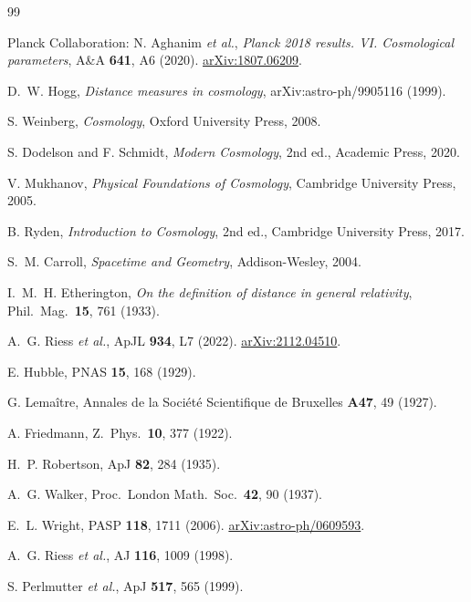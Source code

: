 \documentclass[11pt,a4paper,openany]{report}
\begin{document}
\begin{thebibliography}{99}

Planck Collaboration: N. Aghanim \emph{et al.},
\textit{Planck 2018 results. VI. Cosmological parameters},
A\&A \textbf{641}, A6 (2020).
\href{https://arxiv.org/abs/1807.06209}{arXiv:1807.06209}.

D.~W. Hogg, \textit{Distance measures in cosmology},
arXiv:astro-ph/9905116 (1999).

S. Weinberg, \textit{Cosmology}, Oxford University Press, 2008.

S. Dodelson and F. Schmidt, \textit{Modern Cosmology}, 2nd ed.,
Academic Press, 2020.

V. Mukhanov, \textit{Physical Foundations of Cosmology},
Cambridge University Press, 2005.

B. Ryden, \textit{Introduction to Cosmology}, 2nd ed.,
Cambridge University Press, 2017.

S.~M. Carroll, \textit{Spacetime and Geometry}, Addison-Wesley, 2004.

I.~M.~H. Etherington,
\textit{On the definition of distance in general relativity},
Phil.\ Mag.\ \textbf{15}, 761 (1933).

A.~G. Riess \emph{et al.},
ApJL \textbf{934}, L7 (2022).
\href{https://arxiv.org/abs/2112.04510}{arXiv:2112.04510}.

E. Hubble, PNAS \textbf{15}, 168 (1929).

G. Lemaître,
Annales de la Société Scientifique de Bruxelles \textbf{A47}, 49 (1927).

A. Friedmann, Z.\ Phys.\ \textbf{10}, 377 (1922).

H.~P. Robertson, ApJ \textbf{82}, 284 (1935).

A.~G. Walker, Proc.\ London Math.\ Soc.\ \textbf{42}, 90 (1937).

E.~L. Wright, PASP \textbf{118}, 1711 (2006).
\href{https://arxiv.org/abs/astro-ph/0609593}{arXiv:astro-ph/0609593}.

A.~G. Riess \emph{et al.}, AJ \textbf{116}, 1009 (1998).

S. Perlmutter \emph{et al.}, ApJ \textbf{517}, 565 (1999).


\end{thebibliography}
\end{document}
